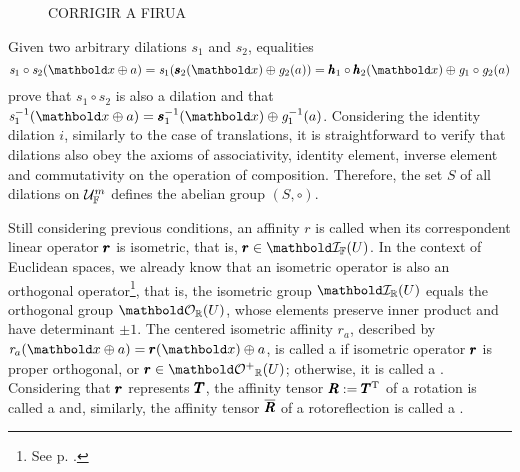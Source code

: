 \begin{figure}[!ht]
\centering
\begin{center}
\scalebox{.72}{} CORRIGIR A FIRUA
\end{center}
\label{fg:dilation}
\end{figure}
Given two arbitrary dilations $\mathit{s}_1$ and $\mathit{s}_2$, equalities
\begin{equation*}
\fua{\mathit{s}_1\circ\mathit{s}_2}{\vto{x}\oplus a}=\fua{\mathit{s}_1}{\fua{\vtf{s}_2}{\vto{x}}\oplus\fua{\mathit{g}_2}{a}}=\fua{\vtf{h}_1\circ\vtf{h}_2}{\vto{x}}\oplus\fua{\mathit{g}_1\circ\mathit{g}_2}{a}
\end{equation*}
prove that $\mathit{s}_1\circ\mathit{s}_2$ is also a dilation and that $\fua{\mathit{s}^{-1}_1}{\vto{x}\oplus a}=\fua{\vtf{s}^{-1}_1}{\vto{x}}\oplus\fua{\mathit{g}^{-1}_1}{a}$. Considering the identity dilation $\mathit{i}$, similarly to the case of translations, it is straightforward to verify that dilations also obey the axioms of associativity, identity element, inverse element and commutativity on the operation of composition. Therefore, the set $S$ of all dilations on $\eamd{U}{F}{m}$ defines the abelian group $(S,\circ)$.


Still considering previous conditions, an affinity $\mathit{r}$ is called  when its correspondent linear operator $\vtf{r}$ is isometric, that is, $\vtf{r}\in\grc{I}{\cam{F}}{U}$. In the context of Euclidean spaces, we already know that an isometric operator is also an orthogonal operator\footnote{See p. \pageref{prg:IsometOrth}.}, that is, the isometric group $\grc{I}{\real}{U}$ equals the orthogonal group $\grc{O}{\real}{U}$, whose elements preserve inner product and have determinant $\pm 1$. The centered isometric affinity $\mathit{r}_a$, described by $\fua{\mathit{r}_a}{\vto{x}\oplus a}=\fua{\vtf{r}}{\vto{x}}\oplus a$, is called a  if isometric operator $\vtf{r}$ is proper orthogonal, or $\vtf{r}\in\grc{O^+}{\real}{U}$; otherwise, it is called a . Considering that $\vtf{r}$ represents $\tnr{T}$, the affinity tensor $\tnr{R}:=\tnr{T}^\text{T}$ of a rotation is called a  and, similarly, the affinity tensor $\overline{\tnr{R}}$ of a rotoreflection is called a . 


